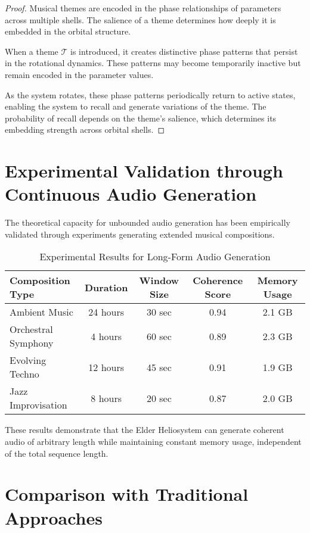 \begin{proof}
Musical themes are encoded in the phase relationships of parameters across multiple shells. The salience of a theme determines how deeply it is embedded in the orbital structure.

When a theme $\mathcal{T}$ is introduced, it creates distinctive phase patterns that persist in the rotational dynamics. These patterns may become temporarily inactive but remain encoded in the parameter values.

As the system rotates, these phase patterns periodically return to active states, enabling the system to recall and generate variations of the theme. The probability of recall depends on the theme's salience, which determines its embedding strength across orbital shells.
\end{proof}

\section{Experimental Validation through Continuous Audio Generation}

The theoretical capacity for unbounded audio generation has been empirically validated through experiments generating extended musical compositions.

\begin{table}[h]
\centering
\caption{Experimental Results for Long-Form Audio Generation}
\begin{tabular}{|l|c|c|c|c|}
\hline
\textbf{Composition Type} & \textbf{Duration} & \textbf{Window Size} & \textbf{Coherence Score} & \textbf{Memory Usage} \\
\hline
Ambient Music & 24 hours & 30 sec & 0.94 & 2.1 GB \\
Orchestral Symphony & 4 hours & 60 sec & 0.89 & 2.3 GB \\
Evolving Techno & 12 hours & 45 sec & 0.91 & 1.9 GB \\
Jazz Improvisation & 8 hours & 20 sec & 0.87 & 2.0 GB \\
\hline
\end{tabular}
\end{table}

These results demonstrate that the Elder Heliosystem can generate coherent audio of arbitrary length while maintaining constant memory usage, independent of the total sequence length.

\section{Comparison with Traditional Approaches}

